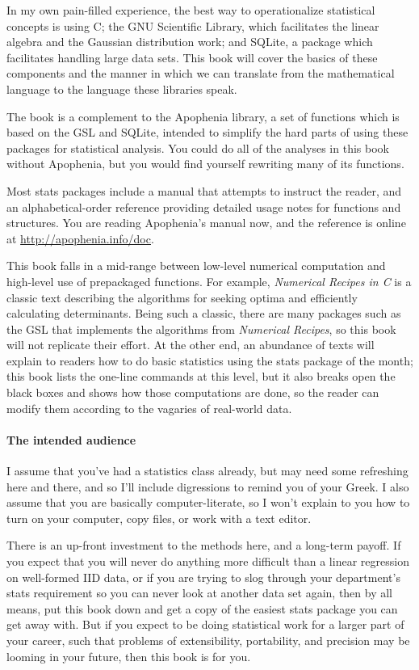 \documentclass[12pt,notitlepage, openany]{book}
\begin{document}
In my own pain-filled experience, the best way to operationalize statistical concepts
is using C; the GNU Scientific Library,  which facilitates the linear
algebra and the Gaussian distribution work; and SQLite, a package which
facilitates handling large data sets. This book will cover the basics
of these components and the manner in which we can translate from the
mathematical language to the language these libraries speak.

The book is a complement to the Apophenia library, a set of functions which
is based on the GSL and SQLite, intended to simplify the hard parts of
using these packages for statistical analysis. You could do all of the
analyses in this book without Apophenia, but you would find yourself
rewriting many of its functions. 

Most stats packages include a manual that attempts to instruct the reader,
and an alphabetical-order reference providing detailed usage notes for
functions and structures.  You are reading Apophenia's manual now,
and the reference is online at \url{http://apophenia.info/doc}.

This book falls in a mid-range between low-level numerical
computation and high-level use of prepackaged functions. For example,
{\sl Numerical Recipes in C} \citep{recipesinc} is a classic text
describing the algorithms for seeking optima and efficiently calculating
determinants. Being such a classic, there are many packages such as the
GSL that implements the algorithms from {\sl Numerical Recipes}, so this
book will not replicate their effort. At the other end, an abundance
of texts will explain to readers how to do basic statistics using the
stats package of the month; this book lists the one-line commands at
this level, but it also breaks open the black boxes and shows how those
computations are done, so the reader can modify them according to the
vagaries of real-world data.

\paragraph{The intended audience}
I assume that you've had a statistics class already, but may need some refreshing
here and there, and so I'll include digressions to remind you of your Greek. I also
assume that you are basically computer-literate, so I won't explain to you how to
turn on your computer, copy files, or work with a text editor.

There is an up-front investment to the methods here, and a long-term
payoff. If you expect that you will never do
anything more difficult than a linear regression on well-formed IID data,
or if you are trying to slog through your department's stats requirement
so you can never look at another data set again, then by all means, put
this book down and get a copy of the easiest stats package you can get
away with. But if you expect to be doing statistical work for a larger
part of your career, such that problems of extensibility, portability,
and precision may be looming in your future, then this book is for you.
\end{document}
